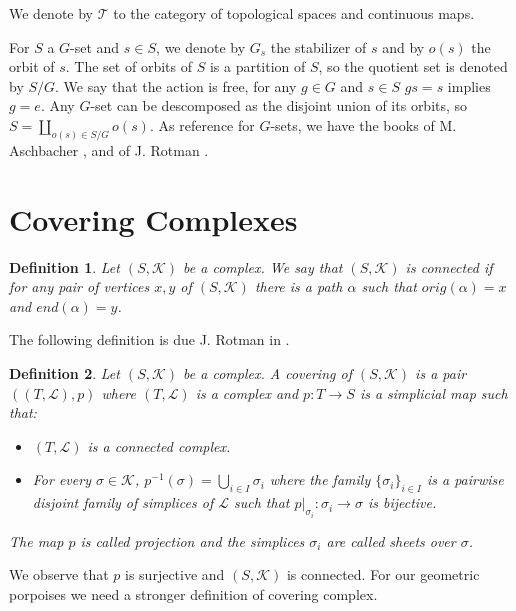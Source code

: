 \documentclass{amsart}
\newtheorem{definition}{Definition}[section]
\begin{document}
We  denote by $\mathcal{T}$ to the category of topological spaces and continuous maps.

For $S$ a $G$-set and $s\in S$, we denote by $G_s$ the stabilizer of $s$ and  by $o(s)$ the orbit of $s$. The set of orbits of $S$ is a partition of $S$, so the quotient set is denoted by $S/G$. We say that the action is free, for any $g\in G$ and $s\in S$ $gs=s$ implies $g=e$. Any $G$-set can be descomposed as the disjoint union of its orbits, so $S=\coprod_{o(s)\in S/G}o(s)$. As reference for $G$-sets, we have the books of M. Aschbacher \cite{aschbacher2000finite}, and of J. Rotman \cite{rotman2012introduction}.

\section{Covering Complexes}


\begin{definition}
Let $(S,\mathcal{K})$ be a complex. We say that $(S,\mathcal{K})$ is connected if for any pair of vertices $x,y$ of $(S,\mathcal{K})$ there is a path $\alpha$ such that $orig(\alpha)=x$ and $end(\alpha)=y$.
\end{definition}

The following definition is due J. Rotman in \cite{rotman1973covering}.

\begin{definition}
Let $(S,\mathcal{K})$ be a complex. A covering of $(S,\mathcal{K})$ is a pair $((T,\mathcal{L}),p)$ where $(T,\mathcal{L})$ is a complex and $p\colon T\longrightarrow S$ is a simplicial map such that:
\begin{itemize}
\item $(T,\mathcal{L})$ is a connected complex.
\item For every $\sigma\in\mathcal{K}$, $p^{-1}(\sigma)=\bigcup_{i\in I}\sigma_i$ where the family $\{\sigma_i\}_{i\in I}$ is a pairwise disjoint family of simplices of $\mathcal{L}$ such that $p|_{\sigma_i}\colon \sigma_i\longrightarrow \sigma$ is bijective.
\end{itemize}
The map $p$ is called projection and the simplices $\sigma_i$ are called sheets over $\sigma$.
\end{definition}

We observe that $p$ is surjective and $(S,\mathcal{K})$ is connected. For our geometric porpoises we need a stronger definition of covering complex.
\end{document}
